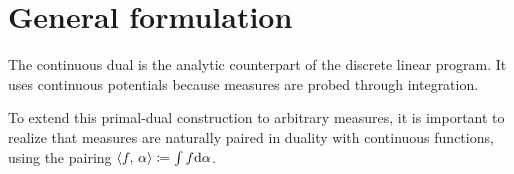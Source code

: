 \section{General formulation}
\label{sec-dual-general}

The continuous dual is the analytic counterpart of the discrete linear program. It uses continuous potentials because measures are probed through integration.

To extend this primal-dual construction to arbitrary measures, it is important to realize that measures are naturally paired in duality with continuous functions, using the pairing $\langle f,\,\alpha\rangle \coloneqq \int f \mathrm{d} \alpha$.


